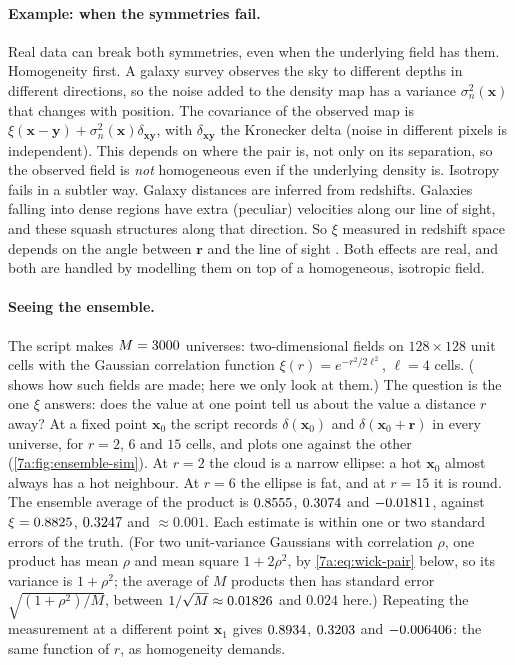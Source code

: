 \paragraph{Example: when the symmetries fail.}
Real data can break both symmetries, even when the underlying field has them.
Homogeneity first. A galaxy survey observes the sky to different depths in
different directions, so the noise added to the density map has a variance
$\sigma_n^2(\bm x)$ that changes with position. The covariance of the observed
map is $\xi(\bm x-\bm y)+\sigma_n^2(\bm x)\delta_{\bm x\bm y}$, with
$\delta_{\bm x\bm y}$ the Kronecker delta (noise in different pixels is
independent). This depends on where the pair is, not only on its separation, so
the observed field is \emph{not} homogeneous even if the underlying density is.
Isotropy fails in a subtler way. Galaxy distances are inferred from redshifts.
Galaxies falling into dense regions have extra (peculiar) velocities along our
line of sight, and these squash structures along that direction. So $\xi$
measured in redshift space depends on the angle between $\bm r$ and the line of
sight \cite{Kaiser1987}. Both effects are real, and both are handled by
modelling them on top of a homogeneous, isotropic field.

\paragraph{Seeing the ensemble.}
The script  makes
$M=3000$ universes: two-dimensional fields on $128\times128$ unit cells
with the Gaussian correlation function $\xi(r)=e^{-r^2/2\ell^2}$, $\ell=4$
cells. ( shows how such fields are made; here we only
look at them.) The question is the one $\xi$ answers: does the value at one point
tell us about the value a distance $r$ away? At a fixed point $\bm x_0$ the script
records $\delta(\bm x_0)$ and $\delta(\bm x_0+\bm r)$ in every universe, for
$r=2$, $6$ and $15$ cells, and plots one against the other
(\cref{7a:fig:ensemble-sim}). At $r=2$ the cloud is a
narrow ellipse: a hot $\bm x_0$ almost always has a hot neighbour. At $r=6$ the
ellipse is fat, and at $r=15$ it is round. The ensemble average of the product
is $0.8555$, $0.3074$ and $-0.01811$, against
$\xi=0.8825$, $0.3247$ and $\approx0.001$. Each estimate is within
one or two standard errors of the truth. (For two unit-variance Gaussians with
correlation $\rho$, one product has mean $\rho$ and mean square $1+2\rho^2$, by
\eqref{7a:eq:wick-pair} below, so its variance is $1+\rho^2$; the average of $M$
products then has standard error
$\sqrt{(1+\rho^2)/M}$, between $1/\sqrt M\approx0.01826$ and $0.024$ here.) Repeating the measurement at a different
point $\bm x_1$ gives $0.8934$, $0.3203$ and
$-0.006406$: the same function of $r$, as homogeneity demands.

